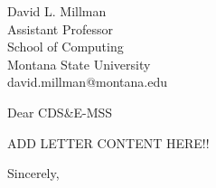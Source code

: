 \documentclass[11pt]{brownletter}
\begin{document}
\begin{letter}{
    David L. Millman \\ 
    Assistant Professor \\
    School of Computing\\
    Montana State University\\
    david.millman@montana.edu
}

\opening{Dear CDS\&E-MSS}

ADD LETTER CONTENT HERE!!

\closing{Sincerely,}




\end{letter}
\end{document}
